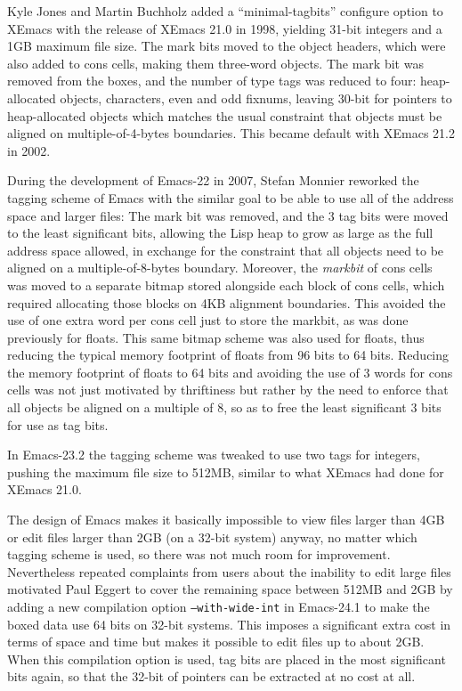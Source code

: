 \documentclass[format=acmsmall, review]{acmart}
\begin{document}
Kyle Jones and Martin Buchholz added a ``minimal-tagbits'' configure option to XEmacs with the release
of XEmacs 21.0 in 1998, yielding 31-bit integers and a 1\;GB maximum
file size.  The mark bits moved to the object headers, which were also
added to cons cells, making them three-word objects.
The mark bit was removed from the boxes, and the number of
type tags was reduced to four: heap-allocated objects,
characters, even and odd fixnums, leaving 30-bit for pointers to
heap-allocated objects which matches the usual constraint that objects must be
aligned on multiple-of-4-bytes boundaries.  This became default with XEmacs
21.2 in 2002.

During the development of Emacs-22 in 2007, Stefan Monnier reworked the
tagging scheme of Emacs with the similar goal to be able to use all of the
address space and larger files: The mark bit was removed, and the 3 tag bits
were moved to the least significant bits, allowing the Lisp heap to grow as
large as the full address space allowed, in exchange for the constraint that
all objects need to be aligned on a multiple-of-8-bytes boundary.  Moreover, the
\emph{markbit} of cons cells was moved to a separate bitmap stored alongside
each block of cons cells, which required allocating those blocks on 4\;KB
alignment boundaries.  This avoided the use of one extra word per cons cell
just to store the markbit, as was done previously for floats.  This same
bitmap scheme was also used for floats, thus reducing the typical
memory footprint of floats from 96 bits to 64 bits.  Reducing the memory
footprint of floats to 64 bits and avoiding the use of 3 words for cons
cells was not just motivated by thriftiness but rather by the need to
enforce that all objects be aligned on a multiple of 8, so as to free the
least significant 3 bits for use as tag bits.

In Emacs-23.2 the tagging scheme was tweaked to use two tags for integers,
pushing the maximum file size to 512\;MB, similar to what XEmacs had
done for XEmacs 21.0.

The design of Emacs makes it basically
impossible to view files larger than 4\;GB or edit files larger than 2\;GB (on
a 32-bit system) anyway, no matter which tagging scheme is used, so there was
not much room for improvement.
Nevertheless repeated complaints from users about the inability to edit
large files motivated Paul Eggert to cover the remaining space between
512\;MB and 2\;GB by adding a new compilation option
\texttt{--with-wide-int} in Emacs-24.1 to make the boxed data
use 64 bits on 32-bit systems.  This imposes a significant extra cost in terms
of space and time but makes it possible to edit files up to about 2\;GB.
When this compilation option is used, tag bits are placed in the most
significant bits again, so that the 32-bit of pointers can be extracted at no
cost at all.
\end{document}
